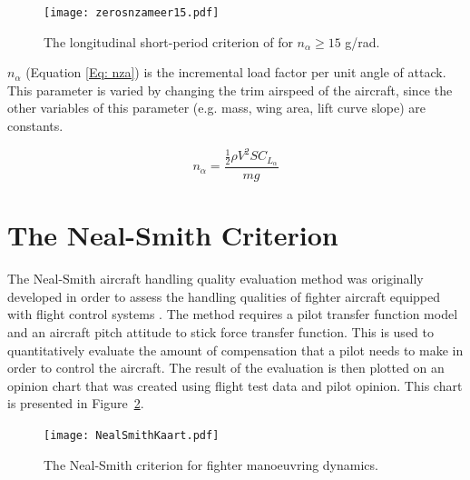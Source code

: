 \documentclass{report}
\begin{document}
\begin{figure}[htb]
	\begin{center}
		\texttt{[image: zerosnzameer15.pdf]}
	\end{center}
	\caption{The longitudinal short-period criterion of \cite{ZeroGertsen} for $n_{\alpha} \ge 15$ g/rad.}
	\label{Fig: zerosnzameer15}
\end{figure}

$n_{\alpha}$ (Equation \ref{Eq: nza}) is the incremental load factor per unit angle of attack.   This parameter is varied by changing the trim airspeed of the aircraft, since the other variables of this parameter (e.g. mass, wing area, lift curve slope) are constants.

\begin{equation}\label{Eq: nza}
	n_{\alpha} = \frac{\frac{1}{2} \rho V^2 S C_{L_\alpha}}{mg}
\end{equation}

\section{The Neal-Smith Criterion}\label{Sec: NealSmithMetodeVerduidelik}


The Neal-Smith aircraft handling quality evaluation method was originally developed in order to assess the handling qualities of fighter aircraft equipped with flight control systems \citep{NealSmith}.  The method requires a pilot transfer function model and an aircraft pitch attitude to stick force transfer function.  This is used to quantitatively evaluate the amount of compensation that a pilot needs to make in order to control the aircraft.  The result of the evaluation is then plotted on an opinion chart that was created using flight test data and pilot opinion.  This chart is presented in \mbox{Figure \ref{Fig: NealSmithKaart}}.

\begin{figure}[htb]
	\begin{center}
		\texttt{[image: NealSmithKaart.pdf]}
	\end{center}
	\caption{The Neal-Smith criterion for fighter manoeuvring dynamics.}
	\label{Fig: NealSmithKaart}
\end{figure}
\end{document}
